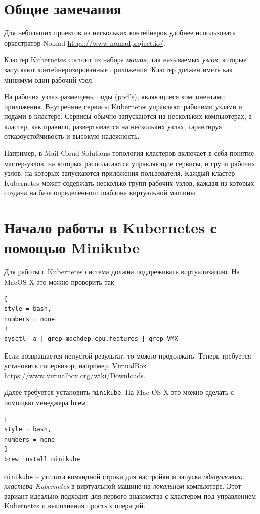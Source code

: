 \documentclass[%
	11pt,
	a4paper,
	utf8,
		]{article}
\begin{document}
\section{Общие замечания}

Для небольших проектов из нескольких контейнеров удобнее использовать оркестратор Nomad \url{https://www.nomadproject.io/}.

Кластер Kubernetes состоит из набора \emph{машин}, так называемых \emph{узлов}, которые запускают контейнеризированные приложения. Кластер должен иметь как минимум один рабочий узел.

На рабочих узлах размещены поды (pod's), являющиеся компонентами приложения. Внутренние сервисы Kubernetes управляют рабочими узлами и подами в кластере. Сервисы обычно запускаются на нескольких компьютерах, а кластер, как правило, развертывается на нескольких узлах, гарантируя отказоустойчивость и высокую надежность.

Например, в Mail Cloud Solutions топология кластеров включает в себя понятие мастер-узлов, на которых располагаются управляющие сервисы, и групп рабочих узлов, на которых запускаются приложения пользователя. Каждый кластер Kubernetes может содержать несколько групп рабочих узлов, каждая из которых создана на базе определенного шаблона виртуальной машины.


\section{Начало работы в Kubernetes с помощью Minikube}

Для работы с Kubernetes система должна поддреживать виртуализацию. На MacOS X это можно проверить так
\begin{lstlisting}[
style = bash,
numbers = none
]
sysctl -a | grep machdep.cpu.features | grep VMX
\end{lstlisting}

Если возвращается непустой результат, то можно продолжать. Теперь требуется установить гипервизор, например, VirtualBox \url{https://www.virtualbox.org/wiki/Downloads}.

Далее требуется установить \texttt{minikube}. На Mac OS X это можно сделать с помощью менеджера \texttt{brew}
\begin{lstlisting}[
style = bash,
numbers = none	
]
brew install minikube
\end{lstlisting}

\texttt{minikube} -- утилита командной строки для настройки и запуска \emph{одноузлового кластера Kubernetes} в виртуальной машине на \emph{локальном} компьютере. Этот вариант идеально подходит для первого знакомства с кластером под управлением Kubernetes и выполнения простых операций.
\end{document}
